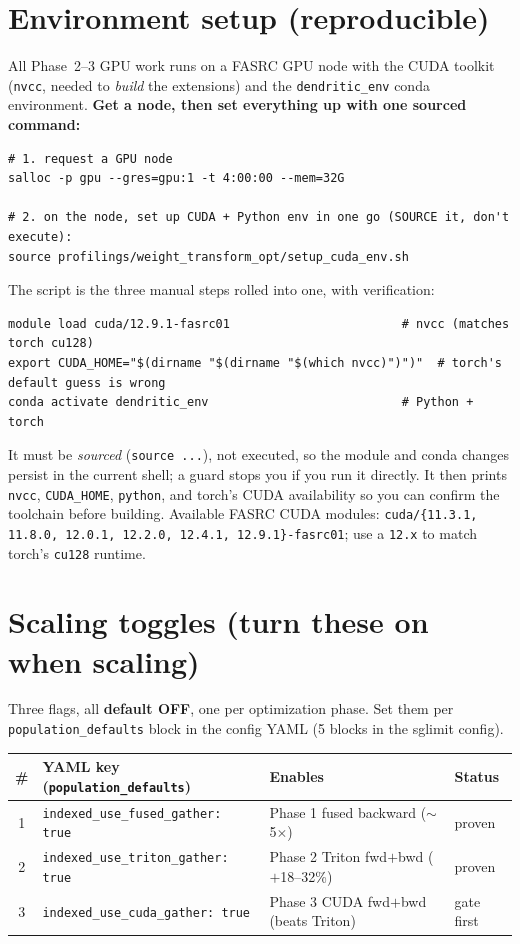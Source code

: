 \documentclass[11pt]{article}
\begin{document}
\appendix
\section{Environment setup (reproducible)}

All Phase~2--3 GPU work runs on a FASRC GPU node with the CUDA toolkit (\texttt{nvcc},
needed to \emph{build} the extensions) and the \texttt{dendritic\_env} conda environment.
\textbf{Get a node, then set everything up with one sourced command:}

\begin{verbatim}
# 1. request a GPU node
salloc -p gpu --gres=gpu:1 -t 4:00:00 --mem=32G

# 2. on the node, set up CUDA + Python env in one go (SOURCE it, don't execute):
source profilings/weight_transform_opt/setup_cuda_env.sh
\end{verbatim}

\noindent The script is the three manual steps rolled into one, with verification:

\begin{verbatim}
module load cuda/12.9.1-fasrc01                        # nvcc (matches torch cu128)
export CUDA_HOME="$(dirname "$(dirname "$(which nvcc)")")"  # torch's default guess is wrong
conda activate dendritic_env                           # Python + torch
\end{verbatim}

\noindent It must be \emph{sourced} (\texttt{source ...}), not executed, so the module and
conda changes persist in the current shell; a guard stops you if you run it directly. It then
prints \texttt{nvcc}, \texttt{CUDA\_HOME}, \texttt{python}, and torch's CUDA availability so you
can confirm the toolchain before building. Available FASRC CUDA modules:
\texttt{cuda/\{11.3.1, 11.8.0, 12.0.1, 12.2.0, 12.4.1, 12.9.1\}-fasrc01}; use a \texttt{12.x}
to match torch's \texttt{cu128} runtime.

\section{Scaling toggles (turn these on when scaling)}

Three flags, all \textbf{default OFF}, one per optimization phase. Set them per
\texttt{population\_defaults} block in the config YAML (5 blocks in the sglimit config).

\begin{center}
\small
\begin{tabular}{@{}clll@{}}
\toprule
\textbf{\#} & \textbf{YAML key (\texttt{population\_defaults})} & \textbf{Enables} & \textbf{Status} \\
\midrule
1 & \texttt{indexed\_use\_fused\_gather: true}  & Phase 1 fused backward ($\sim$5$\times$)         & proven \\
2 & \texttt{indexed\_use\_triton\_gather: true} & Phase 2 Triton fwd$+$bwd ($+$18--32\%)           & proven \\
3 & \texttt{indexed\_use\_cuda\_gather: true}   & Phase 3 CUDA fwd$+$bwd (beats Triton)            & gate first \\
\bottomrule
\end{tabular}
\end{center}
\end{document}
